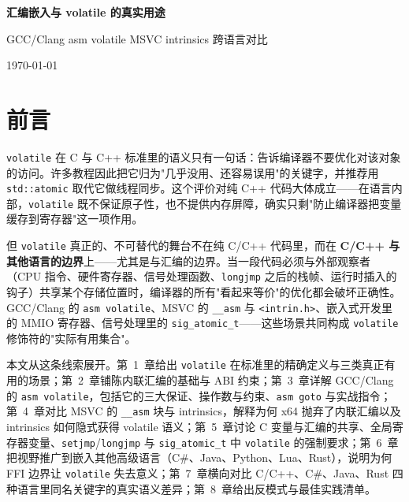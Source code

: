 \documentclass[12pt,a4paper,fontset=fandol]{ctexbook}
\newcommand{\cpp}[1]{C++#1}
\newcommand{\kw}[1]{\texttt{#1}}
\begin{document}
\frontmatter

\begin{titlepage}
\centering
\vspace*{3cm}
{\Huge\bfseries\color{algheadbg} 汇编嵌入与 volatile 的真实用途\par}
\vspace{1cm}
{\LARGE\color{blue!70!black} GCC/Clang asm volatile \textbullet{} MSVC intrinsics \textbullet{} 跨语言对比\par}
\vfill
{\large\color{gray} \today\par}
\end{titlepage}

\chapter*{前\quad 言}

\kw{volatile} 在 C 与 \cpp{} 标准里的语义只有一句话：告诉编译器不要优化对该对象的访问。许多教程因此把它归为"几乎没用、还容易误用"的关键字，并推荐用 \texttt{std::atomic} 取代它做线程同步。这个评价对纯 \cpp{} 代码大体成立——在语言内部，\kw{volatile} 既不保证原子性，也不提供内存屏障，确实只剩"防止编译器把变量缓存到寄存器"这一项作用。

但 \kw{volatile} 真正的、不可替代的舞台不在纯 C/\allowbreak{}\cpp{} 代码里，而在 \textbf{C/C++ 与其他语言的边界}上——尤其是与汇编的边界。当一段代码必须与外部观察者（CPU 指令、硬件寄存器、信号处理函数、\texttt{longjmp} 之后的栈帧、运行时插入的钩子）共享某个存储位置时，编译器的所有"看起来等价"的优化都会破坏正确性。GCC/Clang 的 \texttt{asm volatile}、MSVC 的 \texttt{\_\_asm} 与 \texttt{<intrin.h>}、嵌入式开发里的 MMIO 寄存器、信号处理里的 \texttt{sig\_atomic\_t}——这些场景共同构成 \kw{volatile} 修饰符的"实际有用集合"。

本文从这条线索展开。第~1~章给出 \kw{volatile} 在标准里的精确定义与三类真正有用的场景；第~2~章铺陈内联汇编的基础与 ABI 约束；第~3~章详解 GCC/Clang 的 \texttt{asm volatile}，包括它的三大保证、操作数与约束、\texttt{asm goto} 与实战指令；第~4~章对比 MSVC 的 \texttt{\_\_asm} 块与 intrinsics，解释为何 x64 抛弃了内联汇编以及 intrinsics 如何隐式获得 volatile 语义；第~5~章讨论 C 变量与汇编的共享、全局寄存器变量、\texttt{setjmp}/\allowbreak{}\texttt{longjmp} 与 \texttt{sig\_atomic\_t} 中 \kw{volatile} 的强制要求；第~6~章把视野推广到嵌入其他高级语言（C\#、Java、Python、Lua、Rust），说明为何 FFI 边界让 \kw{volatile} 失去意义；第~7~章横向对比 C/C++、C\#、Java、Rust 四种语言里同名关键字的真实语义差异；第~8~章给出反模式与最佳实践清单。
\end{document}
